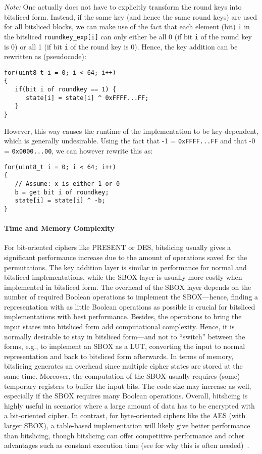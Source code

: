 \emph{Note:} One actually does not have to explicitly transform the round keys into bitsliced form. Instead, if the same key (and hence the same round keys) are used for all bitsliced blocks, we can make use of the fact that each element (bit) \verb+i+ in the bitsliced \verb+roundkey_exp[i]+ can only either be all 0 (if bit \verb+i+ of the round key is 0) or all 1 (if bit \verb+i+ of the round key is 0). 
%
Hence, the key addition can be rewritten as (pseudocode):
\begin{lstlisting}
for(uint8_t i = 0; i < 64; i++)
{
   if(bit i of roundkey == 1) {
      state[i] = state[i] ^ 0xFFFF...FF;
   }
}
\end{lstlisting}

However, this way causes the runtime of the implementation to be key-dependent, which is generally undesirable. Using the fact that -1 = \verb+0xFFFF...FF+ and that -0 = \verb+0x0000...00+, we can however rewrite this as:
\begin{lstlisting}
for(uint8_t i = 0; i < 64; i++)
{
   // Assume: x is either 1 or 0
   b = get bit i of roundkey;
   state[i] = state[i] ^ -b;
}
\end{lstlisting}

\paragraph{Time and Memory Complexity}
For bit-oriented ciphers like PRESENT or \ac{DES}, bitslicing usually gives a significant performance increase due to the amount of operations saved for the permutations. The key addition layer is similar in performance for normal and bitsliced implementations, while the \ac{SBOX} layer is usually more costly when implemented in bitsliced form. The overhead of the \ac{SBOX} layer depends on the number of required Boolean operations to implement the \ac{SBOX}---hence, finding a representation with as little Boolean operations as possible is crucial for bitsliced implementations with best performance.
%
Besides, the operations to bring the input states into bitsliced form add computational complexity. Hence, it is normally desirable to stay in bitsliced form---and not to ``switch'' between the forms, e.g., to implement an \ac{SBOX} as a \ac{LUT}, converting the input to normal representation and back to bitsliced form afterwards. 
%
In terms of memory, bitslicing generates an overhead since multiple cipher states are stored at the same time. Moreover, the computation of the \ac{SBOX} usually requires (some) temporary registers to buffer the input bits. The code size may increase as well, especially if the \ac{SBOX} requires many Boolean operations.
Overall, bitslicing is highly useful in scenarios where a large amount of data has to be encrypted with a bit-oriented cipher. In contrast, for byte-oriented ciphers like the \ac{AES} (with larger \ac{SBOX}), a table-based implementation will likely give better performance than bitslicing, though bitslicing can offer competitive performance and other advantages such as constant execution time (see  for why this is often needed)~\cite{Schwabe17}.

